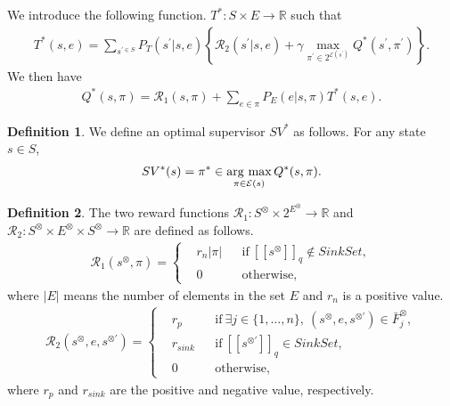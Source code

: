 \documentclass[10 pt, dvipdfmx]{article}
\theoremstyle{definition}
\newtheorem{definition}{Definition}[section]
\newcommand{\myspq}{\ensuremath{[\![s^{\otimes}]\!]}_q}
\newcommand{\myspdq}{\ensuremath{[\![s^{\otimes \prime}]\!]}_q}
\newcommand{\argmax}{\mathop{\rm arg~max}\limits}
\begin{document}
We introduce the following function. $T^{\ast} : S \times E \rightarrow \mathbb{R}$ such that
\begin{align}
  T^{\ast}(s,e) = \sum_{s^{\prime \in S}} P_T(s^{\prime}|s,e) \left \{ \mathcal{R}_2(s^{\prime}|s,e) + \gamma \max_{\pi^{\prime} \in 2^{\mathcal{E}(s^{\prime})}} Q^{\ast}(s^{\prime}, \pi^{\prime}) \right \}.
\end{align}
We then have
\begin{align}
  Q^{\ast}(s,\pi) = \mathcal{R}_1(s,\pi) + \sum_{e \in \pi}P_E(e|s,\pi) T^{\ast}(s,e).
\end{align}
\begin{definition}
We define an optimal supervisor $SV^{\ast}$ as follows. For any state $s \in S$,
\begin{align}
  SV^{\ast}(s) = \pi^{\ast} \in \argmax_{\pi \in \mathcal{E}(s)} Q^{\ast}(s,\pi).
\end{align}
\end{definition}

\begin{definition}
  The two reward functions $\mathcal{R}_1 : S^{\otimes} \times 2^{E^{\otimes}} \rightarrow \mathbb{R}$ and $\mathcal{R}_2 : S^{\otimes} \times E^{\otimes} \times S^{\otimes} \rightarrow \mathbb{R}$ are defined as follows.
  \begin{align}
    \mathcal{R}_1 (s^{\otimes}, \pi) =
    \left\{
    \begin{aligned}
      & r_{n}|\pi| & &\text{if} \ \myspq \notin SinkSet , \\
      & 0 & &\text{otherwise},
    \end{aligned}
    \right.
  \end{align}
  where $|E|$ means the number of elements in the set $E$ and $r_{n}$ is a positive value.
  \begin{align}
    \mathcal{R}_2(s^{\otimes}, e, s^{\otimes \prime}) =
    \left\{
    \begin{aligned}
      &r_p & & \text{if}\ \exists j \in \! \{ 1, \ldots ,n \},\ (s^{\otimes}, e, s^{\otimes \prime}) \in \bar{F}^{\otimes}_j \!,\\
      &r_{sink} & & \text{if}\ \myspdq \in SinkSet,\\
      &0 & & \text{otherwise},
    \end{aligned}
    \right.
  \end{align}
  where $r_p$ and $r_{sink}$ are the positive and negative value, respectively.
  \label{reward_def}
\end{definition}
\end{document}
